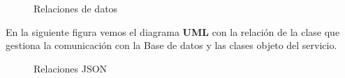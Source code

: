 \begin{figure}[H]
	\centering
	\caption{Relaciones de datos}
	\label{fig:dia-web-ser}
\end{figure}

\pagebreak

En la siguiente figura vemos el diagrama \textbf{UML} con la relación de la clase que gestiona la comunicación con la Base de datos y las clases objeto del servicio.\\

\begin{figure}[H]
	\centering
	\caption{Relaciones JSON}
	\label{fig:dia-web-ser-dos}
\end{figure}

